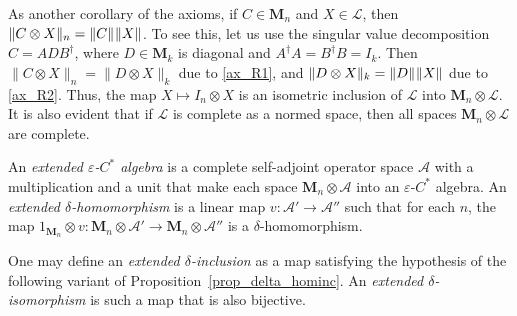 \documentclass[12pt]{article}
\newcommand{\calA}{\mathcal{A}}
\newcommand{\calL}{\mathcal{L}}
\newcommand{\ts}{\mkern1mu}
\newcommand*{\Ma}[1]{\mathbf{M}_{#1}}
\newcommand{\eps}{\varepsilon}
\newtheorem[definition]{Definition}[Theorem]{Definition}
\newtheorem[remark]{Example}[Theorem]{Example}
\newtheorem[remark]{Remark}[Theorem]{Remark}
\newtheorem[remark]{Question}[Theorem]{Open question}
\newtheorem*[definition]{definition}{Definition}
\newtheorem*[remark]{example}{Example}
\newtheorem*[remark]{remark}{Remark}
\newtheorem*[remark]{question}{Open question}
\numberwithin{equation}{section}
\begin{document}
As another corollary of the axioms, if $C\in\Ma{n}$ and $X\in\calL$, then $\|C\otimes X\|_n=\|C\|\ts\|X\|$. To see this, let us use the singular value decomposition $C=ADB^{\dag}$, where $D\in\Ma{k}$ is diagonal and $A^{\dag}A=B^{\dag}B=I_k$. Then $\|C\otimes X\|_n=\|D\otimes X\|_k$ due to \eqref{ax_R1}, and $\|D\otimes X\|_k=\|D\|\ts\|X\|$ due to \eqref{ax_R2}. Thus, the map $X\mapsto I_n\otimes X$ is an isometric inclusion of $\calL$ into $\Ma{n}\otimes\calL$. It is also evident that if $\calL$ is complete as a normed space, then all spaces $\Ma{n}\otimes\calL$ are complete.

\begin{Definition}
An \emph{extended $\eps$-$C^*$ algebra} is a complete self-adjoint operator space $\calA$ with a multiplication and a unit that make each space $\Ma{n}\otimes\calA$ into an $\eps$-$C^*$ algebra. An \emph{extended $\delta$-homomorphism} is a linear map $v\colon\calA'\to\calA''$ such that for each $n$, the map $1_{\Ma{n}}\otimes v\colon \Ma{n}\otimes\calA'\to\Ma{n}\otimes\calA''$ is a $\delta$-homomorphism.
\end{Definition}

One may define an \emph{extended $\delta$-inclusion} as a map satisfying the hypothesis of the following variant of Proposition~\ref{prop_delta_hominc}. An \emph{extended $\delta$-isomorphism} is such a map that is also bijective.
\end{document}
